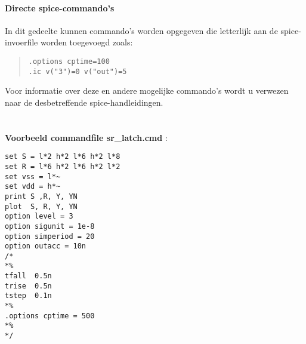 \paragraph{Directe spice-commando's}
In dit gedeelte kunnen commando's worden opgegeven die letterlijk aan de spice-invoerfile
worden toegevoegd zoals:
\begin{quote}
\begin{verbatim}
.options cptime=100
.ic v("3")=0 v("out")=5
\end{verbatim}
\end{quote}
Voor informatie over deze en andere mogelijke commando's wordt u verwezen naar de
desbetreffende spice-handleidingen.\\
\\
\\
{\bf Voorbeeld commandfile sr\_latch.cmd} :
\begin{verbatim}
set S = l*2 h*2 l*6 h*2 l*8 
set R = l*6 h*2 l*6 h*2 l*2
set vss = l*~
set vdd = h*~
print S ,R, Y, YN
plot  S, R, Y, YN
option level = 3
option sigunit = 1e-8
option simperiod = 20
option outacc = 10n
/*
*%
tfall  0.5n
trise  0.5n
tstep  0.1n
*%
.options cptime = 500
*%
*/
\end{verbatim}
\cleardoublepage












